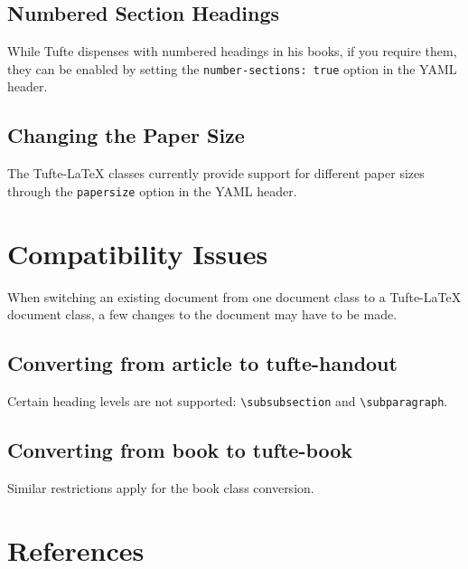 \documentclass[
  twoside,
  symmetric]{tufte-book}
\begin{document}
\section{Numbered Section Headings}\label{sec:numbered-sections}

While Tufte dispenses with numbered headings in his books, if you
require them, they can be enabled by setting the
\texttt{number-sections:\ true} option in the YAML header.

\section{Changing the Paper Size}\label{sec:paper-size}

The Tufte-LaTeX classes currently provide support for different paper
sizes through the \texttt{papersize} option in the YAML header.

\chapter{Compatibility Issues}\label{ch:compatibility}

When switching an existing document from one document class to a
Tufte-LaTeX document class, a few changes to the document may have to be
made.

\section{Converting from article to
tufte-handout}\label{converting-from-article-to-tufte-handout}

Certain heading levels are not supported:
\texttt{\textbackslash{}subsubsection} and
\texttt{\textbackslash{}subparagraph}.

\section{Converting from book to
tufte-book}\label{converting-from-book-to-tufte-book}

Similar restrictions apply for the book class conversion.

\chapter*{References}\label{references-1}
\end{document}

